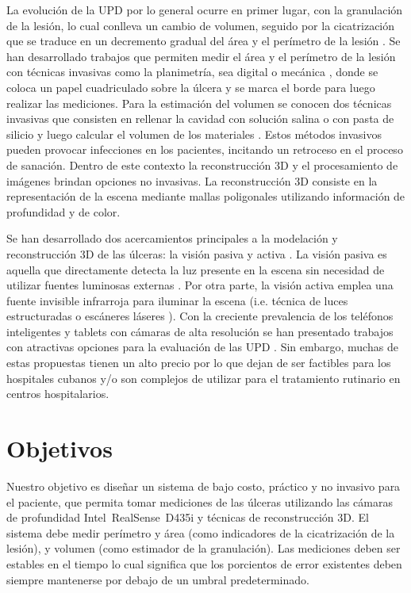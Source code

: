La evolución de la UPD por lo general ocurre en primer lugar, con la granulación de la lesión, lo cual conlleva un cambio de volumen, seguido por la cicatrización que se traduce en un decremento gradual del área y el perímetro de la lesión  \cite{kecelj2007measurement}. Se han desarrollado trabajos que permiten medir el área y el perímetro de la lesión con técnicas invasivas como la planimetría, sea digital o mecánica \cite{oien2002measuring}, donde se coloca un papel cuadriculado sobre la úlcera y se marca el borde para luego realizar las mediciones. Para la estimación del volumen se conocen dos técnicas invasivas que consisten en rellenar la cavidad con solución salina o con pasta de silicio y luego calcular el volumen de los materiales \cite{langemo2008measuring}. Estos métodos invasivos pueden provocar infecciones en los pacientes, incitando un retroceso en el proceso de sanación. Dentro de este contexto la reconstrucción 3D y el procesamiento de imágenes brindan opciones no invasivas. La reconstrucción 3D consiste en la representación de la escena mediante mallas poligonales utilizando información de profundidad y de color.

Se han desarrollado dos acercamientos principales a la modelación y reconstrucción 3D de las úlceras: la visión pasiva y activa \cite{zenteno2018volumetric}. La visión pasiva es aquella que directamente detecta la luz presente en la escena sin necesidad de utilizar fuentes luminosas externas \cite{malian2004medphos, plassmann1998mavis}. Por otra parte, la visión activa emplea una fuente invisible infrarroja para iluminar la escena (i.e. técnica de luces estructuradas \cite{filko2018wound, ching2022segm3d, ozturk1996new} o escáneres láseres \cite{callieri2003derma, krouskop2002noncontact}). Con la creciente prevalencia de los teléfonos inteligentes y tablets con cámaras de alta resolución se han presentado trabajos con atractivas opciones para la evaluación de las UPD \cite{foltynski2014new, wang2014smartphone}. Sin embargo, muchas de estas propuestas tienen un alto precio por lo que dejan de ser factibles para los hospitales cubanos y/o son complejos de utilizar para el tratamiento rutinario en centros hospitalarios.

\section*{Objetivos}

Nuestro objetivo es diseñar un sistema de bajo costo, práctico y no  invasivo para el paciente, que permita tomar mediciones de las úlceras utilizando las cámaras de profundidad Intel\textregistered~RealSense\texttrademark~D435i y técnicas de reconstrucción 3D. El sistema debe medir perímetro y área (como indicadores de la cicatrización de la lesión), y volumen (como estimador de la granulación). Las mediciones deben ser estables en el tiempo lo cual significa que los porcientos de error existentes deben siempre mantenerse por debajo de un umbral predeterminado. 


